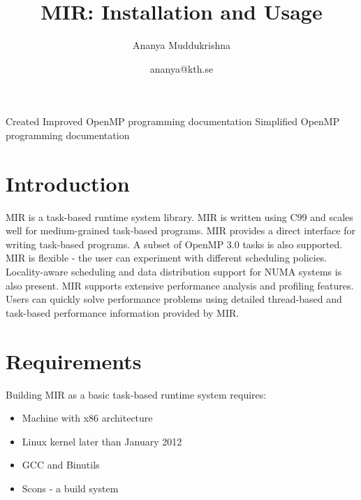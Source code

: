 \documentclass[11pt,a4paper,notitlepage]{article}
\title{MIR: Installation and Usage}
\author{Ananya Muddukrishna}
\date{ananya@kth.se}
\begin{document}
\maketitle

\begin{versionhistory}
 {Created}
 {Improved OpenMP programming documentation}
 {Simplified OpenMP programming documentation}
\end{versionhistory}

\section{Introduction}
MIR is a task-based runtime system library.
MIR is written using C99 and scales well for medium-grained task-based programs. 
MIR provides a direct interface for writing task-based programs.
A subset of OpenMP 3.0 tasks is also supported.
MIR is flexible - the user can experiment with different scheduling policies.
Locality-aware scheduling and data distribution support for NUMA systems is also present.
MIR supports extensive performance analysis and profiling features.
Users can quickly solve performance problems using detailed thread-based and task-based performance information provided by MIR.

\section{Requirements}
Building MIR as a basic task-based runtime system requires:
\begin{itemize}
\item Machine with x86 architecture
\item Linux kernel later than January 2012
\item GCC and Binutils
\item Scons - a build system
\end{itemize}
\end{document}
